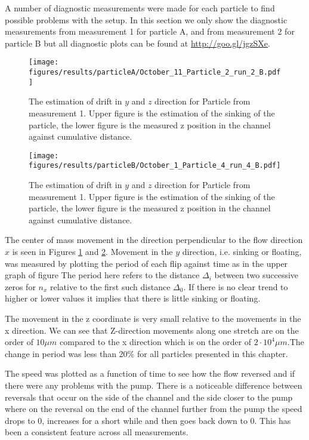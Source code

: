 
A number of diagnostic measurements were made for each particle to find possible problems with the setup. In this section we only show the diagnostic measurements from measurement 1 for particle A, and from measurement 2 for particle B but all diagnostic plots can be found at \url{http://goo.gl/jgzSXe}.


\begin{figure}[H]
\begin{center}
\texttt{[image: figures/results/particleA/October\_11\_Particle\_2\_run\_2\_B.pdf]}
\end{center}
\caption{The estimation of drift in $y$ and $z$ direction for Particle from measurement 1. Upper figure is the estimation of the sinking of the particle, the lower figure is the measured z position in the channel against cumulative distance. }
\label{fig:particleAsink}
\end{figure}

\begin{figure}[H]
\centering
\texttt{[image: figures/results/particleB/October\_1\_Particle\_4\_run\_4\_B.pdf]}	
\caption{The estimation of drift in $y$ and $z$ direction for Particle from measurement 1. Upper figure is the estimation of the sinking of the particle, the lower figure is the measured z position in the channel against cumulative distance.}
\label{fig:particleB2sinking}
\end{figure}



The center of mass movement in the direction perpendicular to the flow direction $x$ is seen in Figures \ref{fig:particleAsink} and \ref{fig:particleB2sinking}. Movement in the $y$ direction, i.e. sinking or floating, was measured by plotting the period of each flip against time as in the upper graph of figure  The period here refers to the distance $\Delta_i$ between two successive zeros for $n_x$ relative to the first such distance $\Delta_0$. If there is no clear trend to higher or lower values it implies that there is little sinking or floating. 

The movement in the z coordinate is very small relative to the movements in the x direction. We can see that Z-direction movements along one stretch are on the order of $10\mu m$ compared to the x direction which is on the order of $2\cdot 10^4 \mu m$.The change in period was less than 20\% for all particles presented in this chapter.

The speed was plotted as a function of time to see how the flow reversed and if there were any problems with the pump. There is a noticeable difference between reversals that occur on the side of the channel and the side closer to the pump where on the reversal on the end of the channel further from the pump the speed drops to 0, increases for a short while and then goes back down to 0. This has been a consistent feature across all measurements.

